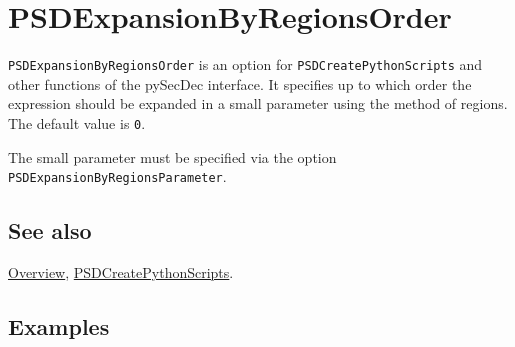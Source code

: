 \documentclass[../FeynHelpersManual.tex]{subfiles}
\begin{document}
\hypertarget{psdexpansionbyregionsorder}{
\section{PSDExpansionByRegionsOrder}\label{psdexpansionbyregionsorder}}

\texttt{PSDExpansionByRegionsOrder} is an option for
\texttt{PSDCreatePythonScripts} and other functions of the pySecDec
interface. It specifies up to which order the expression should be
expanded in a small parameter using the method of regions. The default
value is \texttt{0}.

The small parameter must be specified via the option
\texttt{PSDExpansionByRegionsParameter}.

\subsection{See also}

\hyperlink{toc}{Overview},
\hyperlink{psdcreatepythonscripts}{PSDCreatePythonScripts}.

\subsection{Examples}
\end{document}
